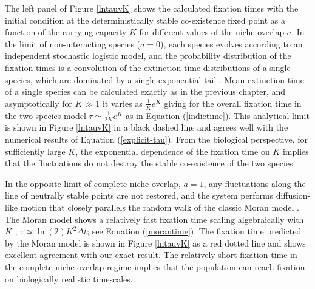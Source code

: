 The left panel of Figure \ref{lntauvK} shows the calculated fixation times with the initial condition at the deterministically stable co-existence fixed point as a function of the carrying capacity $K$ for different values of the niche overlap $a$. 
In the limit of non-interacting species ($a=0$), each species evolves according to an independent stochastic logistic model, and the  probability distribution of the fixation times is a convolution of the extinction time distributions of a single species, which are dominated by a single exponential tail \cite{Norden1982,Hanggi1990,Ovaskainen2010}. 
Mean extinction time of a single species can be calculated exactly as in the previous chapter, and asymptotically for $K\gg 1$ it varies as $\frac{1}{K} e^K$ \cite{Lande1993} giving for the overall fixation time in the two species model  $\tau \simeq \frac{1}{2K} e^K$ as in Equation (\ref{indietime}).
This analytical limit is shown in Figure \ref{lntauvK} in a black dashed line and agrees well with the numerical results of Equation (\ref{explicit-tau}). 
From the biological perspective, for sufficiently large $K$, the exponential dependence of the fixation time on $K$ implies that the fluctuations do not destroy the stable co-existence of the two species. %

In the opposite limit of complete niche overlap, $a=1$, any fluctuations along the line of neutrally stable points are not restored, and the system performs diffusion-like motion that closely parallels the random walk of the classic Moran model \cite{Antal2006,Chotibut2015,Dobrinevski2012,Fisher2014,Constable2015,Lin2012,Kessler2007}. 
The Moran model shows a relatively fast fixation time scaling algebraically with $K$ \cite{Moran1962,Lin2012}, $\tau \simeq \ln(2) K^2 \Delta t$; see Equation (\ref{morantime}). 
The fixation time predicted by the Moran model is shown in Figure \ref{lntauvK} as a red dotted line and shows excellent agreement with our exact result. 
The relatively short fixation time in the complete niche overlap regime implies that the population can reach fixation on biologically realistic timescales. 

